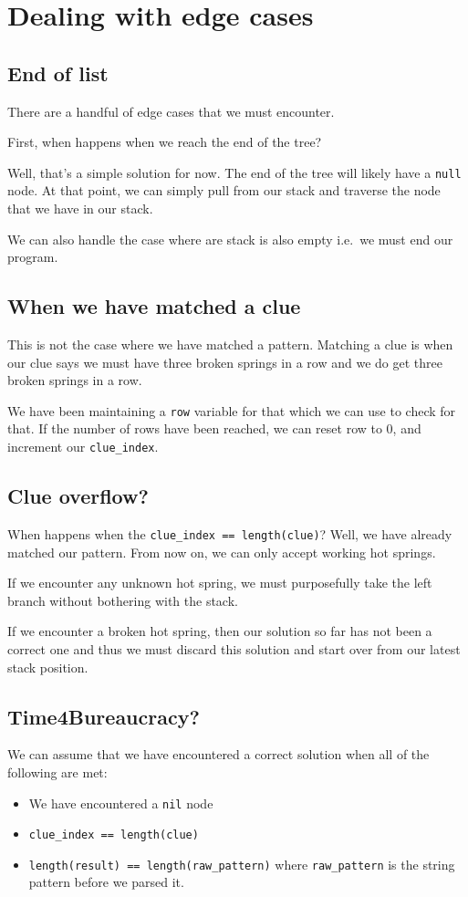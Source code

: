 \section{Dealing with edge cases}

\subsection{End of list}
There are a handful of edge cases that we must encounter.

First, when happens when we reach the end of the tree?

Well, that's a simple solution for now. The end of the tree will likely have a \texttt{null} node. At that point, we can simply pull from our stack and traverse the node that we have in our stack.

We can also handle the case where are stack is also empty i.e.\ we must end our program.

\subsection{When we have matched a clue}
This is not the case where we have matched a pattern.
Matching a clue is when our clue says we must have three broken springs in a row and we do get three broken springs in a row.

We have been maintaining a \texttt{row} variable for that which we can use to check for that. If the number of rows have been reached, we can reset row to 0, and increment our \texttt{clue\_index}.

\subsection{Clue overflow?}
When happens when the \texttt{clue\_index == length(clue)}? Well, we have already matched our pattern. From now on, we can only accept working hot springs. 

If we encounter any unknown hot spring, we must purposefully take the left branch without bothering with the stack. 

If we encounter a broken hot spring, then our solution so far has not been a correct one and thus we must discard this solution and start over from our latest stack position.

\subsection{Time4Bureaucracy?}
We can assume that we have encountered a correct solution when all of the following are met:
\begin{itemize}
    \item We have encountered a \texttt{nil} node
    \item \texttt{clue\_index == length(clue)}
    \item \texttt{length(result) == length(raw\_pattern)} where \texttt{raw\_pattern} is the string pattern before we parsed it.
\end{itemize}